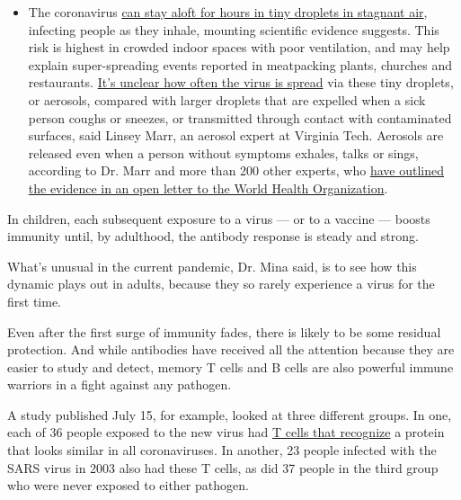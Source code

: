 \begin{itemize}
  \begin{itemize}
  \tightlist
  \item
    The coronavirus
    \href{https://www.nytimes.com/2020/07/04/health/239-experts-with-one-big-claim-the-coronavirus-is-airborne.html?action=click\&pgtype=Article\&state=default\&region=MAIN_CONTENT_3\&context=storylines_faq}{can
    stay aloft for hours in tiny droplets in stagnant air}, infecting
    people as they inhale, mounting scientific evidence suggests. This
    risk is highest in crowded indoor spaces with poor ventilation, and
    may help explain super-spreading events reported in meatpacking
    plants, churches and restaurants.
    \href{https://www.nytimes.com/2020/07/06/health/coronavirus-airborne-aerosols.html?action=click\&pgtype=Article\&state=default\&region=MAIN_CONTENT_3\&context=storylines_faq}{It's
    unclear how often the virus is spread} via these tiny droplets, or
    aerosols, compared with larger droplets that are expelled when a
    sick person coughs or sneezes, or transmitted through contact with
    contaminated surfaces, said Linsey Marr, an aerosol expert at
    Virginia Tech. Aerosols are released even when a person without
    symptoms exhales, talks or sings, according to Dr. Marr and more
    than 200 other experts, who
    \href{https://academic.oup.com/cid/article/doi/10.1093/cid/ciaa939/5867798}{have
    outlined the evidence in an open letter to the World Health
    Organization}.
  \end{itemize}
\end{itemize}

In children, each subsequent exposure to a virus --- or to a vaccine ---
boosts immunity until, by adulthood, the antibody response is steady and
strong.

What's unusual in the current pandemic, Dr. Mina said, is to see how
this dynamic plays out in adults, because they so rarely experience a
virus for the first time.

Even after the first surge of immunity fades, there is likely to be some
residual protection. And while antibodies have received all the
attention because they are easier to study and detect, memory T cells
and B cells are also powerful immune warriors in a fight against any
pathogen.

A study published July 15, for example, looked at three different
groups. In one, each of 36 people exposed to the new virus had
\href{https://www.nature.com/articles/s41586-020-2550-z}{T cells that
recognize} a protein that looks similar in all coronaviruses. In
another, 23 people infected with the SARS virus in 2003 also had these T
cells, as did 37 people in the third group who were never exposed to
either pathogen.

